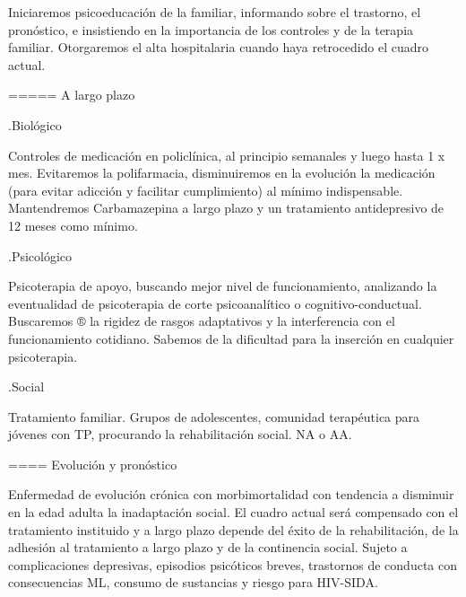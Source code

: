 Iniciaremos psicoeducación de la familiar, informando sobre el trastorno, el pronóstico, e insistiendo en la importancia de los controles y de la terapia familiar. Otorgaremos el alta hospitalaria cuando haya retrocedido el cuadro actual.

===== A largo plazo

.Biológico

Controles de medicación en policlínica, al principio semanales y luego hasta 1 x mes. Evitaremos la polifarmacia, disminuiremos en la evolución la medicación (para evitar adicción y facilitar cumplimiento) al mínimo indispensable. Mantendremos Carbamazepina a largo plazo y un tratamiento antidepresivo de 12 meses como mínimo.

.Psicológico

Psicoterapia de apoyo, buscando mejor nivel de funcionamiento, analizando la eventualidad de psicoterapia de corte psicoanalítico o cognitivo-conductual. Buscaremos ® la rigidez de rasgos adaptativos y la interferencia con el funcionamiento cotidiano. Sabemos de la dificultad para la inserción en cualquier psicoterapia.

.Social

Tratamiento familiar. Grupos de adolescentes, comunidad terapéutica para jóvenes con TP, procurando la rehabilitación social. NA o AA.

==== Evolución y pronóstico

Enfermedad de evolución crónica con morbimortalidad con tendencia a disminuir en la edad adulta la inadaptación social. El cuadro actual será compensado con el tratamiento instituido y a largo plazo depende del éxito de la rehabilitación, de la adhesión al tratamiento a largo plazo y de la continencia social. Sujeto a complicaciones depresivas, episodios psicóticos breves, trastornos de conducta con consecuencias ML, consumo de sustancias y riesgo para HIV-SIDA.
